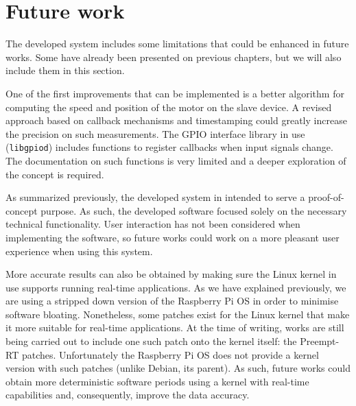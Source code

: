 \section{Future work} \label{sec:future-work}
The developed system includes some limitations that could be enhanced in future works.
Some have already been presented on previous chapters, but we will also include them in this section.

One of the first improvements that can be implemented is a better algorithm for computing the speed and position of the motor on the slave device.
A revised approach based on callback mechanisms and timestamping could greatly increase the precision on such measurements.
The GPIO interface library in use (\verb|libgpiod|) includes functions to register callbacks when input signals change.
The documentation on such functions is very limited and a deeper exploration of the concept is required.

As summarized previously, the developed system in intended to serve a proof-of-concept purpose.
As such, the developed software focused solely on the necessary technical functionality.
User interaction has not been considered when implementing the software, so future works could work on a more pleasant user experience when using this system.

More accurate results can also be obtained by making sure the Linux kernel in use supports running real-time applications.
As we have explained previously, we are using a stripped down version of the Raspberry Pi OS in order to minimise software bloating.
Nonetheless, some patches exist for the Linux kernel that make it more suitable for real-time applications.
At the time of writing, works are still being carried out to include one such patch onto the kernel itself: the Preempt-RT patches.
Unfortunately the Raspberry Pi OS does not provide a kernel version with such patches (unlike Debian, its parent).
As such, future works could obtain more deterministic software periods using a kernel with real-time capabilities and, consequently, improve the data accuracy.
